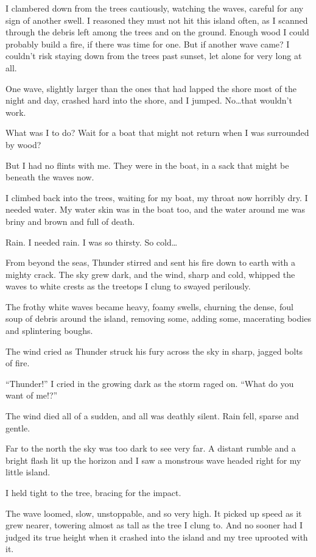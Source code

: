 I clambered down from the trees cautiously, watching the waves, careful for any sign of another swell. I reasoned they must not hit this island often, as I scanned through the debris left among the trees and on the ground. Enough wood I could probably build a fire, if there was time for one. But if another wave came? I couldn't risk staying down from the trees past sunset, let alone for very long at all.

One wave, slightly larger than the ones that had lapped the shore most of the night and day, crashed hard into the shore, and I jumped. No\ldots{}that wouldn't work.

What was I to do? Wait for a boat that might not return when I was surrounded by wood?

But I had no flints with me. They were in the boat, in a sack that might be beneath the waves now.

I climbed back into the trees, waiting for my boat, my throat now horribly dry. I needed water. My water skin was in the boat too, and the water around me was briny and brown and full of death.

Rain. I needed rain. I was so thirsty. So cold\ldots{}

From beyond the seas, Thunder stirred and sent his fire down to earth with a mighty crack. The sky grew dark, and the wind, sharp and cold, whipped the waves to white crests as the treetops I clung to swayed perilously.

The frothy white waves became heavy, foamy swells, churning the dense, foul soup of debris around the island, removing some, adding some, macerating bodies and splintering boughs.

The wind cried as Thunder struck his fury across the sky in sharp, jagged bolts of fire.

``Thunder!'' I cried in the growing dark as the storm raged on. ``What do you want of me!?''

The wind died all of a sudden, and all was deathly silent. Rain fell, sparse and gentle.

Far to the north the sky was too dark to see very far. A distant rumble and a bright flash lit up the horizon and I saw a monstrous wave headed right for my little island.

I held tight to the tree, bracing for the impact.

The wave loomed, slow, unstoppable, and so very high. It picked up speed as it grew nearer, towering almost as tall as the tree I clung to. And no sooner had I judged its true height when it crashed into the island and my tree uprooted with it.

